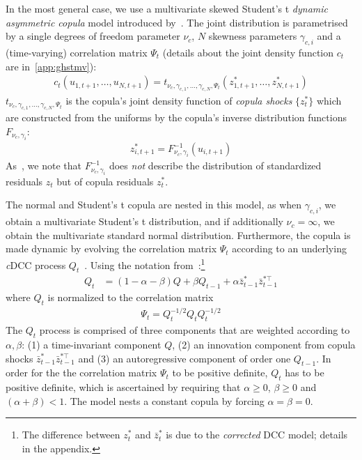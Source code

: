 In the most general case, we use a multivariate skewed Student's t \emph{dynamic asymmetric copula} model introduced by~\textcite{ChristoffersenErrunzaJacobLanglois2012}. The joint distribution is parametrised by a single degrees of freedom parameter $\nu_c$, $N$ skewness parameters $\gamma_{c,i}$ and a (time-varying) correlation matrix $\Psi_{t}$ (details about the joint density function $c_t$ are in~\autoref{app:ghstmv}):
\begin{align}
  c_t(u_{1, t+1}, \ldots, u_{N, t+1}) = t_{\nu_c,\gamma_{c,1},\ldots,\gamma_{c,N},\Psi_t}(z_{1, t+1}^*, \ldots, z_{N, t+1}^*)
\end{align}
$t_{\nu_c,\gamma_{c,1},\ldots,\gamma_{c,N},\Psi_t}$ is the copula's joint density function of \emph{copula shocks} $\{z_t^*\}$ which are constructed from the uniforms by the copula's inverse distribution functions $F_{\nu_c,\gamma_i}$:
\begin{align}
  z_{i, t+1}^* = F_{\nu_c,\gamma_i}^{-1}(u_{i, t+1})
\end{align}
As~\textcite{ChristoffersenErrunzaJacobLanglois2012}, we note that $F^{-1}_{\nu_c,\gamma_i}$ does \emph{not} describe the distribution of standardized residuals ${z_t}$ but of copula residuals ${z_t^*}$.

The normal and Student's t copula are nested in this model, as when $\gamma_{c,i}$, we obtain a multivariate Student's t distribution, and if additionally $\nu_c = \infty$, we obtain the multivariate standard normal distribution. Furthermore, the copula is made dynamic by evolving the correlation matrix $\Psi_t$ according to an underlying \emph{c}DCC process $Q_t$~\autocites[cf.]{Engle2002,Aielli2013}. Using the notation from~\textcite{ChristoffersenLanglois2013}:\footnote{The difference between ${z_t^*}$ and ${\bar{z}_t^*}$ is due to the \emph{corrected} DCC model; details in the appendix.}
\begin{align}
  Q_t &= (1 - \alpha - \beta) Q
    + \beta Q_{t - 1}
    + \alpha \bar{z}_{t - 1}^* \bar{z}_{t - 1}^{*\top}
\end{align}
where $Q_t$ is normalized to the correlation matrix
\begin{align}
  \Psi_t = Q_t^{-1/2} Q_t Q_t^{-1/2}
\end{align}
The $Q_t$ process is comprised of three components that are weighted according to $\alpha, \beta$: (1) a time-invariant component $Q$, (2) an innovation component from copula shocks $\bar{z}_{t-1}^{*} \bar{z}_{t-1}^{*\top}$ and (3) an autoregressive component of order one $Q_{t-1}$. In order for the the correlation matrix $\Psi_t$ to be positive definite, $Q_t$ has to be positive definite, which is ascertained by requiring that $\alpha \geq 0$, $\beta \geq 0$ and $(\alpha + \beta) < 1$. The model nests a constant copula by forcing $\alpha = \beta = 0$.

